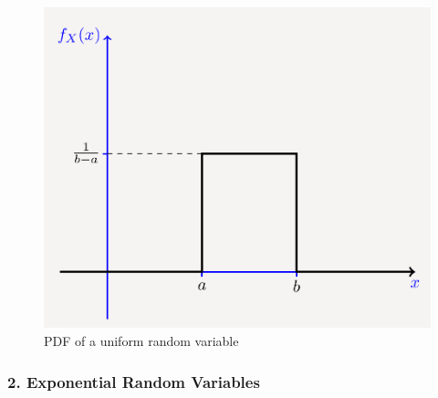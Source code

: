 \begin{figure}
\centering
\includegraphics{Lecture 13 Notes e842fef9a3e0449fa78bac59b75dbc5c/Screenshot_from_2021-08-06_23-02-44.png}
\caption{PDF of a uniform random variable}
\end{figure}

\hypertarget{exponential-random-variables}{%
\subsubsection{2. Exponential Random
Variables}\label{exponential-random-variables}}

